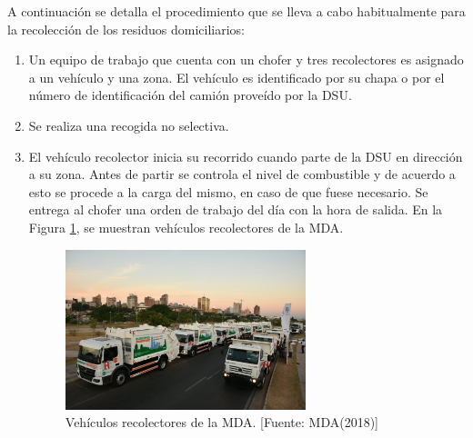 A continuación se detalla el procedimiento que se lleva a cabo habitualmente para la recolección de los residuos domiciliarios:

\begin{enumerate}
\item Un equipo de trabajo que cuenta con un chofer y tres recolectores es asignado a un vehículo y una zona. El vehículo es identificado por su chapa o por el número de identificación del camión proveído por la DSU.
\item Se realiza una recogida no selectiva.
\item El vehículo recolector inicia su recorrido cuando parte de la DSU en dirección a su zona. Antes de partir se controla el nivel de combustible y de acuerdo a esto se procede a la carga del mismo, en caso de que fuese necesario. Se entrega al chofer una orden de trabajo del día con la hora de salida. En la Figura \ref{fig:vehiculoRecolectorMDA}, se muestran vehículos recolectores de la MDA.

\begin{figure}[H]
    \centering
    \includegraphics[width=7cm]{camion_recolector_mda.png}
    \caption{Vehículos recolectores de la MDA. [Fuente: MDA(2018)]}
    \label{fig:vehiculoRecolectorMDA}
\end{figure}


\end{enumerate}
